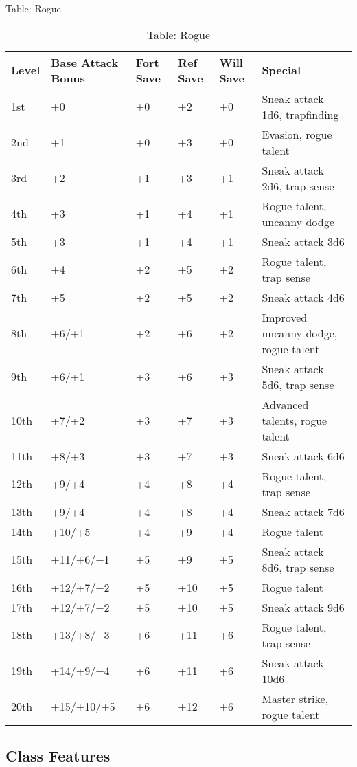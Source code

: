 Table: Rogue
\begin{table}[]
\caption{Table: Rogue}
\sffamily
\begin{tabular}{llllll}
Level & Base Attack Bonus & Fort Save & Ref Save & Will Save & Special                          \\
\hline
1st & +0 & +0 & +2 & +0 & Sneak attack 1d6, trapfinding\\
2nd & +1 & +0 & +3 & +0 & Evasion, rogue talent\\
3rd & +2 & +1 & +3 & +1 & Sneak attack 2d6, trap sense\\
4th & +3 & +1 & +4 & +1 & Rogue talent, uncanny dodge\\
5th & +3 & +1 & +4 & +1 & Sneak attack 3d6\\
6th & +4 & +2 & +5 & +2 & Rogue talent, trap sense\\
7th & +5 & +2 & +5 & +2 & Sneak attack 4d6\\
8th & +6/+1 & +2 & +6 & +2 & Improved uncanny dodge, rogue talent\\
9th & +6/+1 & +3 & +6 & +3 & Sneak attack 5d6, trap sense\\
10th & +7/+2 & +3 & +7 & +3 & Advanced talents, rogue talent\\
11th & +8/+3 & +3 & +7 & +3 & Sneak attack 6d6\\
12th & +9/+4 & +4 & +8 & +4 & Rogue talent, trap sense\\
13th & +9/+4 & +4 & +8 & +4 & Sneak attack 7d6\\
14th & +10/+5 & +4 & +9 & +4 & Rogue talent\\
15th & +11/+6/+1 & +5 & +9 & +5 & Sneak attack 8d6, trap sense\\
16th & +12/+7/+2 & +5 & +10 & +5 & Rogue talent\\
17th & +12/+7/+2 & +5 & +10 & +5 & Sneak attack 9d6\\
18th & +13/+8/+3 & +6 & +11 & +6 & Rogue talent, trap sense\\
19th & +14/+9/+4 & +6 & +11 & +6 & Sneak attack 10d6\\
20th & +15/+10/+5 & +6 & +12 & +6 & Master strike, rogue talent\\
\end{tabular}
\end{table}
				
\subsection{Class Features}

